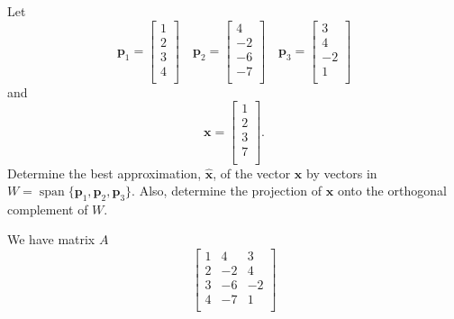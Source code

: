 \documentclass[11pt]{article}
\DeclareMathOperator{\spn}{span}
\begin{document}
\begin{homeworkProblem}

    Let
    \begin{equation*}
        \mathbf{p}_1 =
        \begin{bmatrix}
            1 \\
            2 \\
            3 \\
            4 \\
        \end{bmatrix} \quad
        \mathbf{p}_2 =
        \begin{bmatrix}
            4  \\
            -2 \\
            -6 \\
            -7 \\
        \end{bmatrix} \quad
        \mathbf{p}_3 =
        \begin{bmatrix}
            3  \\
            4  \\
            -2 \\
            1  \\
        \end{bmatrix}
    \end{equation*}
    and
    \[
        \mathbf{x} = \begin{bmatrix}
            1 \\
            2 \\
            3 \\
            7 \\
        \end{bmatrix}.
    \]
    Determine the best approximation, $\hat{\mathbf{x}}$, of the vector $\mathbf{x}$ by vectors in $W = \spn\{\mathbf{p}_1, \mathbf{p}_2, \mathbf{p}_3\}$.
    Also, determine the projection of $\mathbf{x}$ onto the orthogonal complement of $W$. \\

    \solution

    We have matrix $A$
    \[
        \begin{bmatrix}
            1 & 4  & 3  \\
            2 & -2 & 4  \\
            3 & -6 & -2 \\
            4 & -7 & 1  \\
        \end{bmatrix}
    \]


\end{homeworkProblem}
\end{document}
